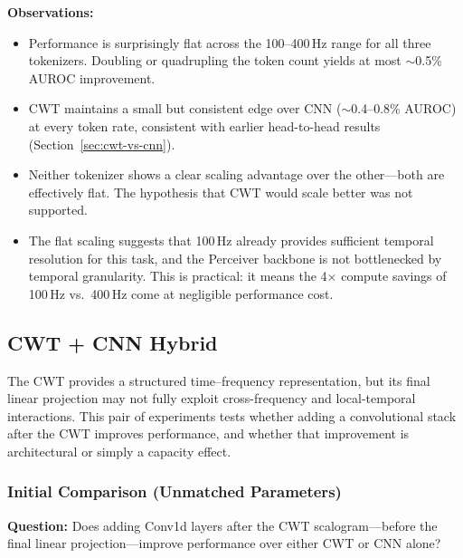 \documentclass[11pt, a4paper]{article}
\begin{document}
\textbf{Observations:}
\begin{itemize}[nosep]
      \item Performance is surprisingly flat across the 100--400\,Hz
            range for all three tokenizers. Doubling or quadrupling the
            token count yields at most $\sim$0.5\% AUROC improvement.
      \item CWT maintains a small but consistent edge over CNN
            ($\sim$0.4--0.8\% AUROC) at every token rate, consistent
            with earlier head-to-head results
            (Section~\ref{sec:cwt-vs-cnn}).
      \item Neither tokenizer shows a clear scaling advantage over the
            other---both are effectively flat. The hypothesis that CWT
            would scale better was not supported.
      \item The flat scaling suggests that 100\,Hz already provides
            sufficient temporal resolution for this task, and the
            Perceiver backbone is not bottlenecked by temporal
            granularity. This is practical: it means the 4$\times$
            compute savings of 100\,Hz vs.\ 400\,Hz come at negligible
            performance cost.
\end{itemize}


\subsection{CWT + CNN Hybrid}
\label{sec:cwt-cnn-hybrid}

The CWT provides a structured time--frequency representation, but its
final linear projection may not fully exploit cross-frequency and
local-temporal interactions. This pair of experiments tests whether
adding a convolutional stack after the CWT improves performance, and
whether that improvement is architectural or simply a capacity effect.

\subsubsection{Initial Comparison (Unmatched Parameters)}
\label{sec:cwt-cnn-initial}

\textbf{Question:} Does adding Conv1d layers after the CWT
scalogram---before the final linear projection---improve performance
over either CWT or CNN alone?
\end{document}
